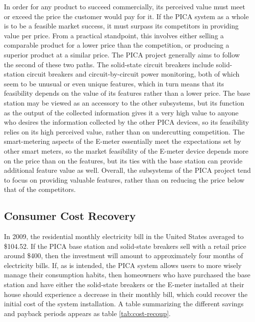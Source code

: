 In order for any product to succeed commercially, its perceived value must meet or exceed the price the customer would pay for it. If the PICA system as a whole is to be a feasible market success, it must surpass its competitors in providing value per price. From a practical standpoint, this involves either selling a comparable product for a lower price than the competition, or producing a superior product at a similar price. The PICA project generally aims to follow the second of these two paths. The solid-state circuit breakers include solid-station circuit breakers and circuit-by-circuit power monitoring, both of which seem to be unusual or even unique features, which in turn means that its feasibility depends on the value of its features rather than a lower price. The base station may be viewed as an accessory to the other subsystems, but its function as the output of the collected information gives it a very high value to anyone who desires the information collected by the other PICA devices, so its feasibility relies on its high perceived value, rather than on undercutting competition. The smart-metering aspects of the E-meter essentially meet the expectations set by other smart meters, so the market feasibility of the E-meter device depends more on the price than on the features, but its ties with the base station can provide additional feature value as well. Overall, the subsystems of the PICA project tend to focus on providing valuable features, rather than on reducing the price below that of the competitors.

\subsection{Consumer Cost Recovery} %
In 2009, the residential monthly electricity bill in the United States averaged to \$104.52\cite{DOE-EIA}. If the PICA base station and solid-state breakers sell with a retail price around \$400, then the investment will amount to approximately four months of electricity bills. If, as is intended, the PICA system allows users to more wisely manage their consumption habits, then homeowners who have purchased the base station and have either the solid-state breakers or the E-meter installed at their house should experience a decrease in their monthly bill, which could recover the initial cost of the system installation. A table summarizing the different savings and payback periods appears as table \ref{tab:cost-recoup}.

